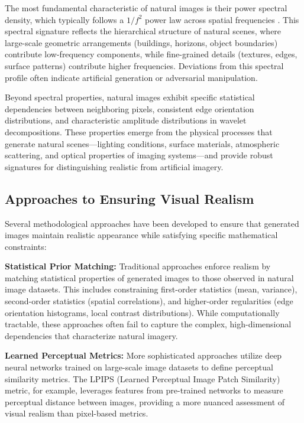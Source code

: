 The most fundamental characteristic of natural images is their power spectral density, which typically follows a $1/f^2$ power law across spatial frequencies \citep{Field1987RelationsBT}. This spectral signature reflects the hierarchical structure of natural scenes, where large-scale geometric arrangements (buildings, horizons, object boundaries) contribute low-frequency components, while fine-grained details (textures, edges, surface patterns) contribute higher frequencies. Deviations from this spectral profile often indicate artificial generation or adversarial manipulation.

Beyond spectral properties, natural images exhibit specific statistical dependencies between neighboring pixels, consistent edge orientation distributions, and characteristic amplitude distributions in wavelet decompositions. These properties emerge from the physical processes that generate natural scenes—lighting conditions, surface materials, atmospheric scattering, and optical properties of imaging systems—and provide robust signatures for distinguishing realistic from artificial imagery.

\subsection{Approaches to Ensuring Visual Realism}

Several methodological approaches have been developed to ensure that generated images maintain realistic appearance while satisfying specific mathematical constraints:

\textbf{Statistical Prior Matching:} Traditional approaches enforce realism by matching statistical properties of generated images to those observed in natural image datasets. This includes constraining first-order statistics (mean, variance), second-order statistics (spatial correlations), and higher-order regularities (edge orientation histograms, local contrast distributions). While computationally tractable, these approaches often fail to capture the complex, high-dimensional dependencies that characterize natural imagery.

\textbf{Learned Perceptual Metrics:} More sophisticated approaches utilize deep neural networks trained on large-scale image datasets to define perceptual similarity metrics. The LPIPS (Learned Perceptual Image Patch Similarity) metric, for example, leverages features from pre-trained networks to measure perceptual distance between images, providing a more nuanced assessment of visual realism than pixel-based metrics.

